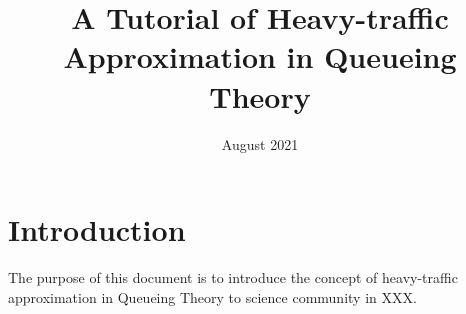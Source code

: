 \documentclass{article}
\title{A Tutorial of Heavy-traffic Approximation in Queueing Theory}
\author{}
\date{August 2021}
\begin{document}
\maketitle

\section{Introduction}
The purpose of this document is to introduce the concept of heavy-traffic approximation in Queueing Theory to science community in XXX. 
\end{document}
